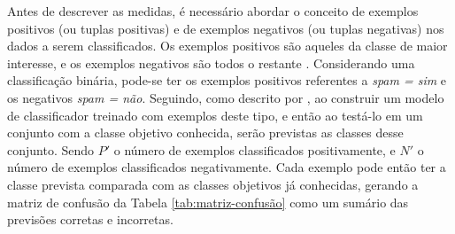         Antes de descrever as medidas, é necessário abordar o conceito de exemplos positivos (ou tuplas positivas) e de exemplos negativos (ou tuplas negativas) nos dados a serem classificados. 
        Os exemplos positivos são aqueles da classe de maior interesse, e os exemplos negativos são todos o restante \cite[p.~364]{Han:2011:DMC:1972541}.
        Considerando uma classificação binária, pode-se ter os exemplos positivos referentes a \textit{spam = sim} e os negativos \textit{spam = não}.
        Seguindo, como descrito por \cite[p.~364--365]{Han:2011:DMC:1972541}, ao construir um modelo de classificador treinado com exemplos deste tipo, e então ao testá-lo em um conjunto com a classe objetivo conhecida, serão previstas as classes desse conjunto.
        Sendo $P'$ o número de exemplos classificados positivamente, e $N'$ o número de exemplos classificados negativamente. 
        Cada exemplo pode então ter a classe prevista comparada com as classes objetivos já conhecidas, gerando a matriz de confusão da Tabela \ref{tab:matriz-confusão} como um sumário das previsões corretas e incorretas.


        
        
